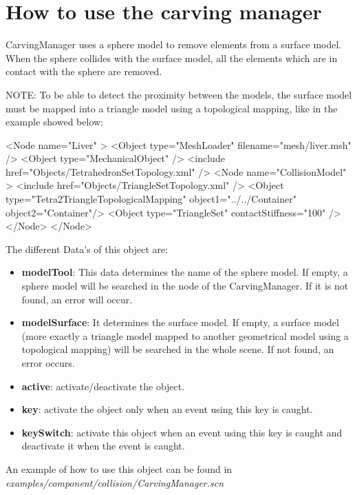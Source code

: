 \section{How to use the carving manager}

CarvingManager uses a sphere model to remove elements from a surface model. When the sphere collides with the surface model, all the elements which are in contact with the sphere are removed.

NOTE: To be able to detect the proximity between the models, the surface model must be mapped into a triangle model using a topological mapping, like in the example showed below:

\begin{code_xml}
	<Node name="Liver" >
		<Object type="MeshLoader" filename="mesh/liver.msh" />
		<Object type="MechanicalObject" />
		<include href="Objects/TetrahedronSetTopology.xml" />
		<Node name="CollisionModel" >
			<include href="Objects/TriangleSetTopology.xml" />
        		<Object type="Tetra2TriangleTopologicalMapping" object1="../../Container" 
				object2="Container"/>
			<Object type="TriangleSet" contactStiffness="100" />
		</Node>
	</Node>
\end{code_xml}

The different Data's of this object are:

\begin{itemize}
\item \textbf{modelTool}: This data determines the name of the sphere model. If empty, a sphere model will be searched in the node of the CarvingManager. If it is not found, an error will occur.
\item \textbf{modelSurface}: It determines the surface model. If empty, a surface model (more exactly a triangle model mapped to another geometrical model using a topological mapping) will be searched in the whole scene. If not found, an error occurs.
\item \textbf{active}: activate/deactivate the object.
\item \textbf{key}: activate the object only when an event using this key is caught.
\item \textbf{keySwitch}: activate this object when an event using this key is caught and deactivate it when the event is caught.
\end{itemize}

An example of how to use this object can be found in \textit{examples/component/collision/CarvingManager.scn}